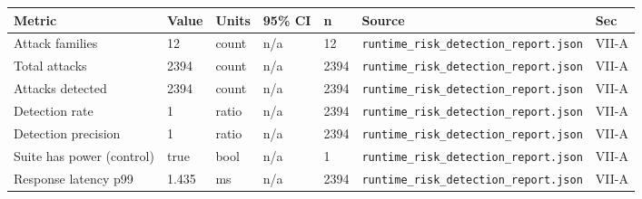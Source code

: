 \begin{tabular}{lllllll}
\hline
Metric & Value & Units & 95\% CI & n & Source & Sec \\
\hline
Attack families & 12 & count & n/a & 12 & \texttt{runtime_risk_detection_report.json} & VII-A \\
Total attacks & 2394 & count & n/a & 2394 & \texttt{runtime_risk_detection_report.json} & VII-A \\
Attacks detected & 2394 & count & n/a & 2394 & \texttt{runtime_risk_detection_report.json} & VII-A \\
Detection rate & 1 & ratio & n/a & 2394 & \texttt{runtime_risk_detection_report.json} & VII-A \\
Detection precision & 1 & ratio & n/a & 2394 & \texttt{runtime_risk_detection_report.json} & VII-A \\
Suite has power (control) & true & bool & n/a & 1 & \texttt{runtime_risk_detection_report.json} & VII-A \\
Response latency p99 & 1.435 & ms & n/a & 2394 & \texttt{runtime_risk_detection_report.json} & VII-A \\
\hline
\end{tabular}
